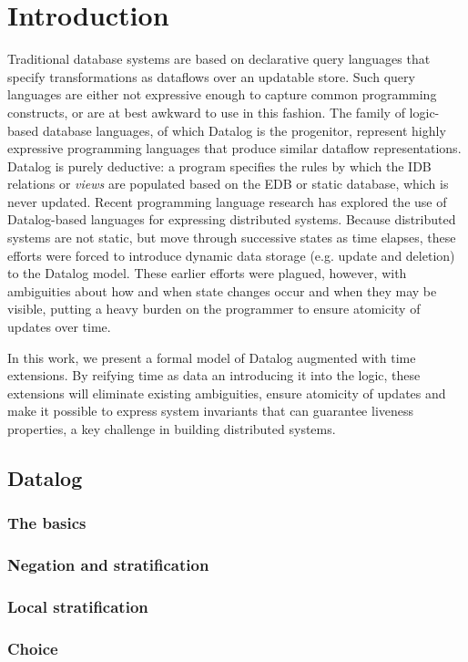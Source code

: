 \section{Introduction}

Traditional database systems are based on declarative query languages that specify transformations as dataflows over an updatable store.
Such query languages are either not expressive enough to capture common programming constructs, or are at best awkward to
use in this fashion.  The family of logic-based database languages, of which Datalog is the progenitor, represent highly
expressive programming languages that produce similar dataflow representations.  Datalog is purely deductive: a program specifies the rules
by which the IDB relations or \emph{views} are populated based on the EDB or static database, which is never updated.
Recent programming language research has explored the use of Datalog-based languages for expressing distributed systems.  Because distributed
systems are not static, but move through successive states as time elapses, these efforts were forced to introduce dynamic data storage (e.g. update and
deletion) to the Datalog model.  These earlier efforts were plagued, however, with ambiguities about how and when state changes occur and when 
they may be visible, putting a heavy burden on the programmer to ensure atomicity of updates over time.

In this work, we present a formal model of Datalog augmented with time extensions.  By reifying time as data an introducing it into the logic, these 
extensions will eliminate existing ambiguities, ensure atomicity of updates and make it possible to express system invariants that 
can guarantee liveness properties, a key challenge in building distributed systems.


\subsection{Datalog}

\subsubsection{The basics}  

\subsubsection{Negation and stratification}

\subsubsection{Local stratification}

\subsubsection{Choice}
